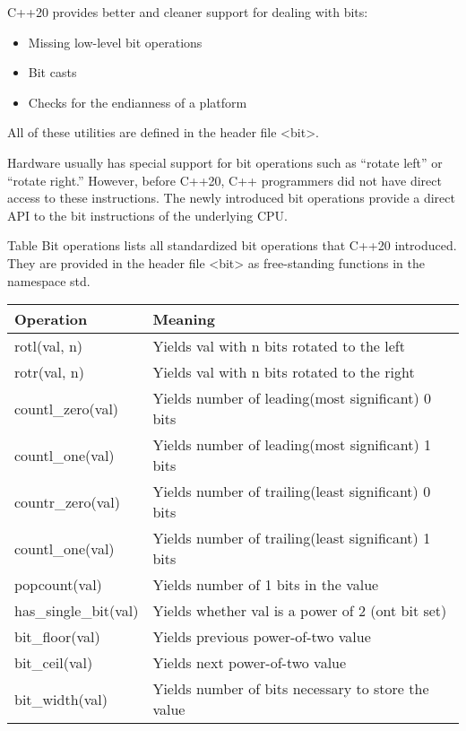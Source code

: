 
C++20 provides better and cleaner support for dealing with bits:

\begin{itemize}
\item 
Missing low-level bit operations

\item 
Bit casts

\item 
Checks for the endianness of a platform
\end{itemize}

All of these utilities are defined in the header file <bit>.


Hardware usually has special support for bit operations such as “rotate left” or “rotate right.” However, before C++20, C++ programmers did not have direct access to these instructions. The newly introduced bit operations provide a direct API to the bit instructions of the underlying CPU.

Table Bit operations lists all standardized bit operations that C++20 introduced. They are provided in the header file <bit> as free-standing functions in the namespace std.

\begin{longtable}[c]{|l|l|}
\hline
\textbf{Operation}    & \textbf{Meaning}                                    \\ \hline
\endfirsthead
%
\endhead
%
rotl(val, n)          & Yields val with n bits rotated to the left          \\ \hline
rotr(val, n)          & Yields val with n bits rotated to the right         \\ \hline
countl\_zero(val)     & Yields number of leading(most significant) 0 bits   \\ \hline
countl\_one(val)      & Yields number of leading(most significant) 1 bits   \\ \hline
countr\_zero(val)     & Yields number of trailing(least significant) 0 bits \\ \hline
countl\_one(val)      & Yields number of trailing(least significant) 1 bits \\ \hline
popcount(val)         & Yields number of 1 bits in the value                \\ \hline
has\_single\_bit(val) & Yields whether val is a power of 2 (ont bit set)    \\ \hline
bit\_floor(val)       & Yields previous power-of-two value                  \\ \hline
bit\_ceil(val)        & Yields next power-of-two value                      \\ \hline
bit\_width(val)       & Yields number of bits necessary to store the value  \\ \hline
\end{longtable}


